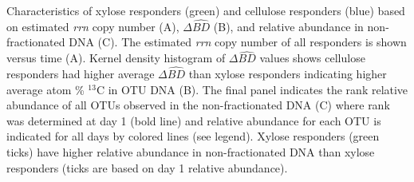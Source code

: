 Characteristics of xylose responders (green) and cellulose responders (blue)
based on estimated \textit{rrn} copy number (A), $\Delta\hat{BD}$ (B), and
relative abundance in non-fractionated DNA (C). The estimated \textit{rrn} copy
number of all responders is shown versus time (A). Kernel density histogram of
$\Delta\hat{BD}$ values shows cellulose responders had higher average
$\Delta\hat{BD}$ than xylose responders indicating higher average atom \%
$^{13}$C in OTU DNA (B). The final panel indicates the rank relative abundance
of all OTUs observed in the non-fractionated DNA (C) where rank was determined
at day 1 (bold line) and relative abundance for each OTU is indicated for all
days by colored lines (see legend). Xylose responders (green ticks) have higher
relative abundance in non-fractionated DNA than xylose responders (ticks are
based on day 1 relative abundance).
